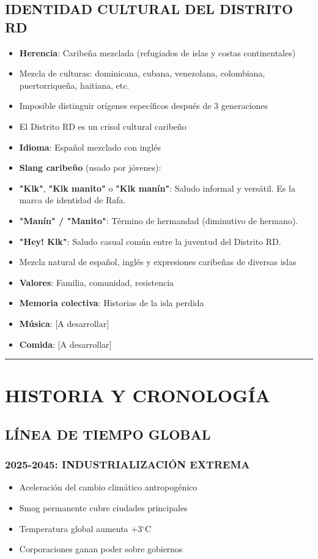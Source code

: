 \documentclass[11pt,a4paper]{report}
\begin{document}
\subsection{IDENTIDAD CULTURAL DEL DISTRITO RD}
\begin{itemize}
  \item \textbf{Herencia}: Caribeña mezclada (refugiados de islas y costas continentales)
  \item Mezcla de culturas: dominicana, cubana, venezolana, colombiana, puertorriqueña, haitiana, etc.
  \item Imposible distinguir orígenes específicos después de 3 generaciones
  \item El Distrito RD es un crisol cultural caribeño
  \item \textbf{Idioma}: Español mezclado con inglés
  \item \textbf{Slang caribeño} (usado por jóvenes):
  \item \textbf{"Klk"}, \textbf{"Klk manito"} o \textbf{"Klk manín"}: Saludo informal y versátil. Es la marca de identidad de Rafa.
  \item \textbf{"Manín" / "Manito"}: Término de hermandad (diminutivo de hermano).
  \item \textbf{"Hey! Klk"}: Saludo casual común entre la juventud del Distrito RD.
  \item Mezcla natural de español, inglés y expresiones caribeñas de diversas islas
  \item \textbf{Valores}: Familia, comunidad, resistencia
  \item \textbf{Memoria colectiva}: Historias de la isla perdida
  \item \textbf{Música}: [A desarrollar]
  \item \textbf{Comida}: [A desarrollar]

\end{itemize}
\bigskip\hrule\bigskip

\section{HISTORIA Y CRONOLOGÍA}

\subsection{LÍNEA DE TIEMPO GLOBAL}

\subsubsection{2025-2045: INDUSTRIALIZACIÓN EXTREMA}
\begin{itemize}
  \item Aceleración del cambio climático antropogénico
  \item Smog permanente cubre ciudades principales
  \item Temperatura global aumenta +3$^\circ$C
  \item Corporaciones ganan poder sobre gobiernos

\end{itemize}
\end{document}
